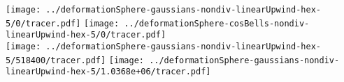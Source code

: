 \documentclass{article}
\begin{document}
\texttt{[image: ../deformationSphere-gaussians-nondiv-linearUpwind-hex-5/0/tracer.pdf]}
\texttt{[image: ../deformationSphere-cosBells-nondiv-linearUpwind-hex-5/0/tracer.pdf]} \\
\texttt{[image: ../deformationSphere-gaussians-nondiv-linearUpwind-hex-5/518400/tracer.pdf]}
\texttt{[image: ../deformationSphere-gaussians-nondiv-linearUpwind-hex-5/1.0368e+06/tracer.pdf]}
\end{document}
